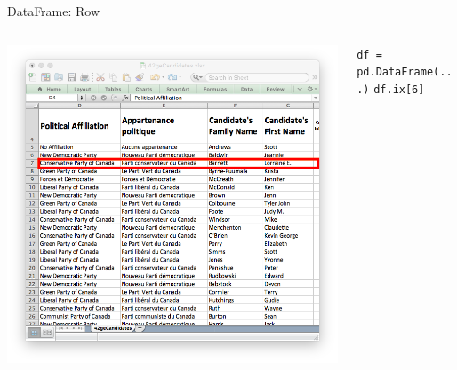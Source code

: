 \documentclass{beamer}
\begin{document}
\begin{frame}{DataFrame: Row}
    \begin{columns}
        \begin{column}{0.5\textwidth}
            \includegraphics[width=\textwidth]{img/data-frame-row.png}
        \end{column}
        \begin{column}{0.5\textwidth}
        \footnotesize
        \texttt{df = pd.DataFrame(...)}
        \texttt{df.ix[6]}
        \end{column}
    \end{columns}
\end{frame}
\end{document}
